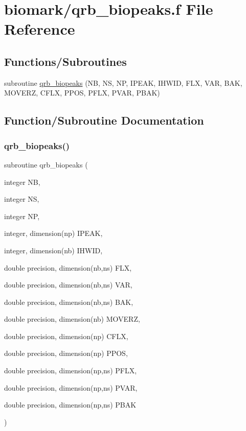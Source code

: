 \hypertarget{qrb__biopeaks_8f}{}\section{biomark/qrb\+\_\+biopeaks.f File Reference}
\label{qrb__biopeaks_8f}
\subsection*{Functions/\+Subroutines}
\begin{DoxyCompactItemize}
\item 
subroutine \hyperlink{qrb__biopeaks_8f_a833708a4469563fc325855bed16f056e}{qrb\+\_\+biopeaks} (NB, NS, NP, I\+P\+E\+AK, I\+H\+W\+ID, F\+LX, V\+AR, B\+AK, M\+O\+V\+E\+RZ, C\+F\+LX, P\+P\+OS, P\+F\+LX, P\+V\+AR, P\+B\+AK)
\end{DoxyCompactItemize}


\subsection{Function/\+Subroutine Documentation}
\mbox{\label{qrb__biopeaks_8f_a833708a4469563fc325855bed16f056e}} 
\subsubsection{\texorpdfstring{qrb\+\_\+biopeaks()}{qrb\_biopeaks()}}
{\footnotesize\ttfamily subroutine qrb\+\_\+biopeaks (\begin{DoxyParamCaption}\item[{integer}]{NB,  }\item[{integer}]{NS,  }\item[{integer}]{NP,  }\item[{integer, dimension(np)}]{I\+P\+E\+AK,  }\item[{integer, dimension(nb)}]{I\+H\+W\+ID,  }\item[{double precision, dimension(nb,ns)}]{F\+LX,  }\item[{double precision, dimension(nb,ns)}]{V\+AR,  }\item[{double precision, dimension(nb,ns)}]{B\+AK,  }\item[{double precision, dimension(nb)}]{M\+O\+V\+E\+RZ,  }\item[{double precision, dimension(np)}]{C\+F\+LX,  }\item[{double precision, dimension(np)}]{P\+P\+OS,  }\item[{double precision, dimension(np,ns)}]{P\+F\+LX,  }\item[{double precision, dimension(np,ns)}]{P\+V\+AR,  }\item[{double precision, dimension(np,ns)}]{P\+B\+AK }\end{DoxyParamCaption})}

